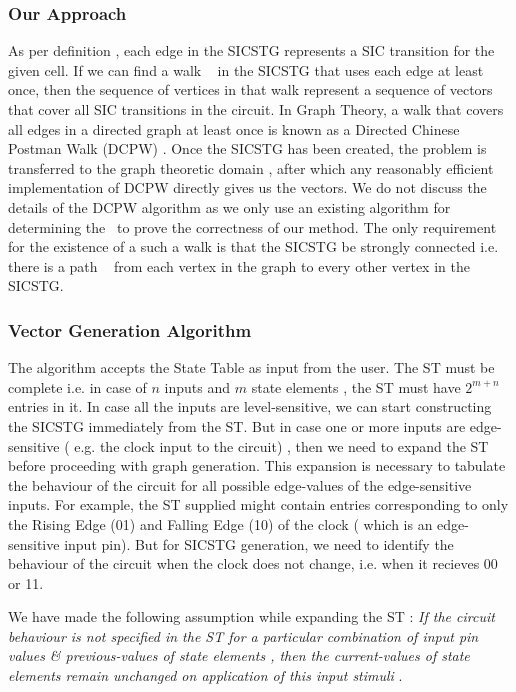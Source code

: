 \documentclass[final]{ieee}
\begin{document}
\subsubsection{Our Approach}
As per definition , each edge in the SICSTG represents a SIC transition for the given cell. If we can find a walk ~\cite{west} in the SICSTG that uses each edge at least once, then the sequence of vertices in that walk represent a sequence of vectors that cover all SIC transitions in the circuit. In Graph Theory, a walk that covers all edges in a directed graph at least once is known as a Directed Chinese Postman Walk (DCPW) . Once the SICSTG has been created, the problem is transferred to the graph theoretic domain , after which any reasonably efficient implementation of DCPW directly gives us the vectors. We do not discuss the details of the DCPW algorithm as we only use an existing algorithm for determining the ~\cite{CPP}to prove the correctness of our method. The only requirement for the existence of a such a walk is that the SICSTG be strongly connected i.e. there is a path ~\cite{west} from each vertex in the graph to every other vertex in the SICSTG. 

\subsubsection{Vector Generation Algorithm}
The algorithm accepts the State Table as input from the user. The ST must be complete i.e. in case of $n$ inputs and $m$ state elements , the ST must have $2^{m+n}$ entries in it. In case all the inputs are level-sensitive, we can start constructing the SICSTG immediately from the ST. But in case one or more inputs are edge-sensitive ( e.g. the clock input to the circuit) , then we need to expand the ST before proceeding with graph generation. This expansion is necessary to tabulate the behaviour of the circuit for all possible edge-values of the edge-sensitive inputs. For example, the ST supplied might contain entries corresponding to only the Rising Edge (01) and Falling Edge (10) of the clock ( which is an edge-sensitive input pin). But for SICSTG generation, we need to identify the behaviour of the circuit when the clock does not change, i.e. when it recieves 00 or 11.

We have made the following assumption while expanding the ST : 
\textit{If the circuit behaviour is not specified in the ST for a particular combination of input pin values \& previous-values of state elements , then the current-values of state elements remain unchanged on application of this input stimuli }.
\end{document}
